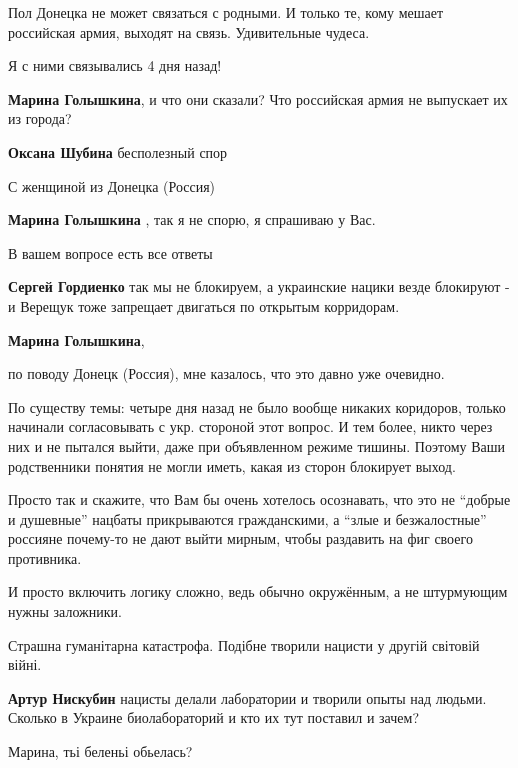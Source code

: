 \begin{itemize}
\begin{itemize}
Пол Донецка не может связаться с родными. И только те, кому мешает российская
армия, выходят на связь. Удивительные чудеса.

Я с ними связывались 4 дня назад!

\textbf{Марина Голышкина}, и что они сказали? Что российская армия не выпускает их из города?

\textbf{Оксана Шубина} бесполезный спор

С женщиной из Донецка (Россия)

\textbf{Марина Голышкина} , так я не спорю, я спрашиваю у Вас.

В вашем вопросе есть все ответы

\textbf{Сергей Гордиенко} так мы не блокируем, а украинские нацики везде блокируют - и Верещук тоже запрещает двигаться по открытым корридорам.

\textbf{Марина Голышкина}, 

по поводу Донецк (Россия), мне казалось, что это давно уже очевидно.

По существу темы: четыре дня назад не было вообще никаких коридоров, только
начинали согласовывать с укр. стороной этот вопрос. И тем более, никто через
них и не пытался выйти, даже при объявленном режиме тишины. Поэтому Ваши
родственники понятия не могли иметь, какая из сторон блокирует выход.

Просто так и скажите, что Вам бы очень хотелось осознавать, что это не \enquote{добрые
и душевные} нацбаты прикрываются гражданскими, а \enquote{злые и безжалостные} россияне
почему-то не дают выйти мирным, чтобы раздавить на фиг своего противника.

И просто включить логику сложно, ведь обычно окружённым, а не штурмующим нужны
заложники.

\end{itemize} %


Страшна гуманітарна катастрофа. Подібне творили нацисти у другій світовій
війні.

\begin{itemize} %
\textbf{Артур Нискубин} нацисты делали лаборатории и творили опыты над людьми. Сколько в Украине биолабораторий и кто их тут поставил и зачем?

Марина, тьі беленьі обьелась?


\end{itemize}
\end{itemize}
